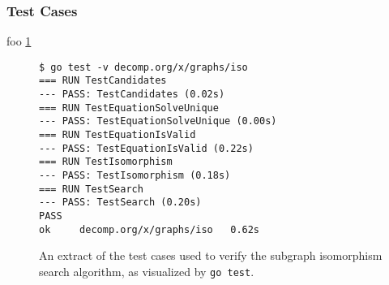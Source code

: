 
\subsubsection{Test Cases}





foo \ref{fig:iso_test_cases}

\begin{figure}[htbp]
	\begin{center}
		\begin{verbatim}
$ go test -v decomp.org/x/graphs/iso
=== RUN TestCandidates
--- PASS: TestCandidates (0.02s)
=== RUN TestEquationSolveUnique
--- PASS: TestEquationSolveUnique (0.00s)
=== RUN TestEquationIsValid
--- PASS: TestEquationIsValid (0.22s)
=== RUN TestIsomorphism
--- PASS: TestIsomorphism (0.18s)
=== RUN TestSearch
--- PASS: TestSearch (0.20s)
PASS
ok     decomp.org/x/graphs/iso   0.62s
		\end{verbatim}
		\caption{An extract of the test cases used to verify the subgraph isomorphism search algorithm, as visualized by \texttt{go test}.}
		\label{fig:iso_test_cases}
	\end{center}
\end{figure}
